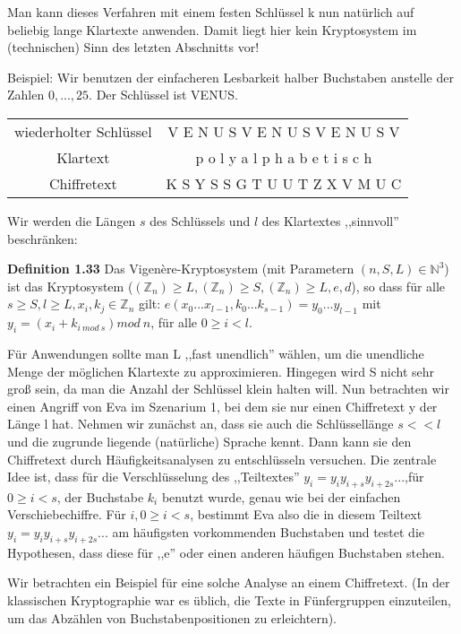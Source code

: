 \documentclass[a4paper]{article}
\begin{document}
\begin{multicols}{3}
    Man kann dieses Verfahren mit einem festen Schlüssel k nun natürlich auf beliebig lange Klartexte anwenden. Damit liegt hier kein Kryptosystem im (technischen) Sinn des letzten Abschnitts vor!

    Beispiel: Wir benutzen der einfacheren Lesbarkeit halber Buchstaben anstelle der Zahlen $0,...,25$. Der Schlüssel ist VENUS.
    
    \begin{tabular}{c|c}
     wiederholter Schlüssel & V E N U S V E N U S V E N U S V \\
     Klartext        & p o l y a l p h a b e t i s c h \\
     Chiffretext      & K S Y S S G T U U T Z X V M U C 
    \end{tabular}

    Wir werden die Längen $s$ des Schlüssels und $l$ des Klartextes ,,sinnvoll'' beschränken:

    \textbf{Definition 1.33} Das Vigenère-Kryptosystem (mit Parametern $(n,S,L)\in\mathbb{N}^3$) ist das Kryptosystem ($(\mathbb{Z}_n)\geq L,(\mathbb{Z}_n)\geq S,(\mathbb{Z}_n)\geq L,e,d$), so dass für alle $s\geq S,l\geq L,x_i,k_j\in\mathbb{Z}_n$ gilt: $e(x_0...x_{l-1},k_0 ...k_{s-1})=y_0 ...y_{l-1}$ mit $y_i=(x_i+k_{i\ mod\ s}) mod\ n$, für alle $0\geq i < l$.

    Für Anwendungen sollte man L ,,fast unendlich'' wählen, um die unendliche Menge der möglichen Klartexte zu approximieren. Hingegen wird S nicht sehr groß sein, da man die Anzahl der Schlüssel klein halten will.
    Nun betrachten wir einen Angriff von Eva im Szenarium 1, bei dem sie nur einen Chiffretext y der Länge l hat. Nehmen wir zunächst an, dass sie auch die Schlüssellänge $s<<l$ und die zugrunde liegende (natürliche) Sprache kennt. Dann kann sie den Chiffretext durch Häufigkeitsanalysen zu entschlüsseln versuchen. Die zentrale Idee ist, dass für die Verschlüsselung des ,,Teiltextes'' $y_i=y_iy_{i+s}y_{i+2s}...$,für $0\geq i<s$, der Buchstabe $k_i$ benutzt wurde, genau wie bei der einfachen Verschiebechiffre. Für $i,0\geq i<s$, bestimmt Eva also die in diesem Teiltext $y_i=y_iy_{i+s}y_{i+2s}...$ am häufigsten vorkommenden Buchstaben und testet die Hypothesen, dass diese für ,,e'' oder einen anderen häufigen Buchstaben stehen.

    Wir betrachten ein Beispiel für eine solche Analyse an einem Chiffretext. (In der klassischen Kryptographie war es üblich, die Texte in Fünfergruppen einzuteilen, um das Abzählen von Buchstabenpositionen zu erleichtern).


\end{multicols}
\end{document}

